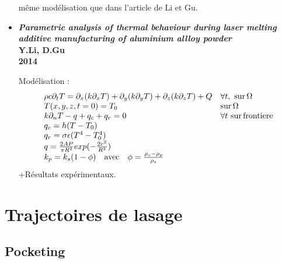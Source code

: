 \documentclass[11pt,a4paper]{article}
\begin{document}
\begin{itemize}
		\vspace{0cm}
		
		même modélisation que dans l'article de Li et Gu.
		
		\item \textbf{\emph{Parametric analysis of thermal behaviour during laser melting additive manufacturing of aluminium allloy powder} \\
			Y.Li, D.Gu \\
			2014}
		
		\vspace{0cm}
		
		Modélisation :
		\begin{equation}
		\begin{array}{ll}
			\rho c\partial_t T=\partial_x(k\partial_x T)+\partial_y(k\partial_y T)+\partial_z(k\partial_z T)+Q  & \forall t,\,\,\textrm{sur}\,\Omega\\
			T(x,y,z,t=0)=T_0 & \textrm{sur}\,\Omega \\
			k\partial_nT-q+q_c+q_r=0 & \forall t\,\,\textrm{sur\,frontiere} \\
			q_c=h(T-T_0) & \,\\
			q_r=\sigma\epsilon(T^4-T_0^4)& \, \\
			q=\frac{2AP}{\pi R^2}exp(-\frac{2r^2}{R^2}) & \,\\
			k_p=k_s(1-\phi)\quad\textrm{avec}\quad \phi=\frac{\rho_s-\rho_p}{\rho_s}& \,
		\end{array}
		\end{equation}
		+Résultats expérimentaux.
\end{itemize}
	


\section{Trajectoires de lasage}

\subsection{Pocketing}
\end{document}
